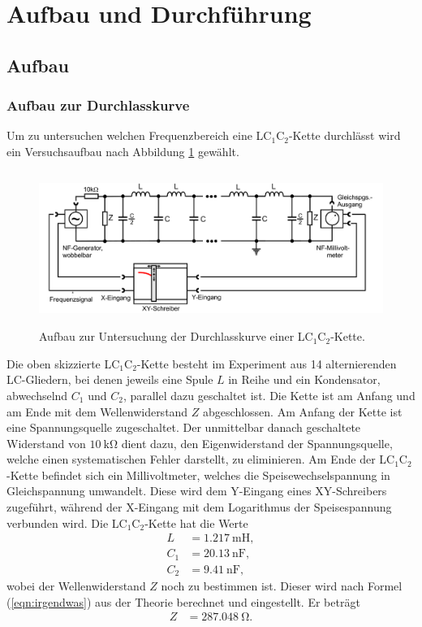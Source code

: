 \section{Aufbau und Durchführung}
\label{sec:Durchführung}
\subsection{Aufbau}
\label{sec:Aufbau}
\subsubsection{Aufbau zur Durchlasskurve}Um zu untersuchen welchen Frequenzbereich eine LC$_1$C$_2$-Kette durchlässt wird ein Versuchsaufbau nach Abbildung \ref{dfig:1} gewählt.

\begin{figure}[H]
  \centering
  \includegraphics[height=5cm]{durchlass.png}
  \caption{Aufbau zur Untersuchung der Durchlasskurve einer LC$_1$C$_2$-Kette. \cite{sample}}
  \label{dfig:1}
\end{figure}

Die oben skizzierte LC$_1$C$_2$-Kette besteht im Experiment aus 14 alternierenden LC-Gliedern, bei denen jeweils eine Spule $L$ in Reihe und ein Kondensator, abwechselnd $C_1$ und $C_2$, parallel dazu geschaltet ist.
Die Kette ist am Anfang und am Ende mit dem Wellenwiderstand $Z$ abgeschlossen.
Am Anfang der Kette ist eine Spannungsquelle zugeschaltet.
Der unmittelbar danach geschaltete Widerstand von $\SI{10}{\kilo\ohm}$ dient dazu, den Eigenwiderstand der Spannungsquelle, welche einen systematischen Fehler darstellt, zu eliminieren.
Am Ende der LC$_1$C$_2$-Kette befindet sich ein Millivoltmeter, welches die Speisewechselspannung in Gleichspannung umwandelt.
Diese wird dem Y-Eingang eines XY-Schreibers zugeführt, während der X-Eingang mit dem Logarithmus der Speisespannung verbunden wird.
Die LC$_1$C$_2$-Kette hat die Werte
\begin{align*}
  L   &= \SI{1,217}{\milli\henry},\\
  C_1 &= \SI{20,13}{\nano\farad},\\
  C_2 &= \SI{9,41}{\nano\farad},
\end{align*}
wobei der Wellenwiderstand $Z$ noch zu bestimmen ist.
Dieser wird nach Formel (\ref{eqn:irgendwas}) aus der Theorie berechnet und eingestellt.
Er beträgt
\begin{align*}
  Z   &= \SI{287.048}{\ohm}.
\end{align*}


